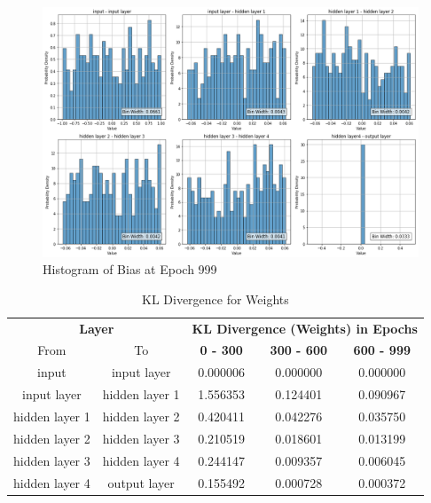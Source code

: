 \documentclass{ioereport}
\begin{document}
    \begin{figure}[H]
        \centering
        \includegraphics[width=\linewidth]{assets/audio histogram/epoch999Bias.png}
        \caption{Histogram of Bias at Epoch 999}
        \label{fig:audio-bias-999}
    \end{figure}

    \begin{table}[H]
    \caption{KL Divergence for Weights}
    \centering
    \begin{tabular}{|c|c|c|c|c|}
    \hline
    \multicolumn{2}{|c|}{\textbf{Layer}} & \multicolumn{3}{c|}{\textbf{KL Divergence (Weights) in Epochs}} \\
    \cline{1-5}
    From & To & \textbf{0 - 300} & \textbf{300 - 600} & \textbf{600 - 999} \\
    \hline
    input & input layer & 0.000006 & 0.000000 & 0.000000 \\
    input layer & hidden layer 1 & 1.556353 & 0.124401 & 0.090967 \\
    hidden layer 1 & hidden layer 2 & 0.420411 & 0.042276 & 0.035750 \\
    hidden layer 2 & hidden layer 3 & 0.210519 & 0.018601 & 0.013199 \\
    hidden layer 3 & hidden layer 4 & 0.244147 & 0.009357 & 0.006045 \\
    hidden layer 4 & output layer & 0.155492 & 0.000728 & 0.000372 \\
    \hline
    \end{tabular}
    \end{table}
\end{document}
